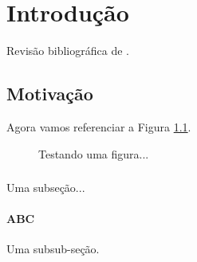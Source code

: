 \chapter{Introdução}

Revisão bibliográfica de \citet{Viola01rapidobject}.\\

\section{Motivação}

Agora vamos referenciar a Figura \ref{figuraEPS}.

\begin{figure}
   \begin{center}
   \end{center}
   \caption{Testando uma figura...\label{figuraEPS}}
\end{figure}


\subsection{}

Uma subseção...

\subsubsection{ABC}

Uma subsub-seção.
